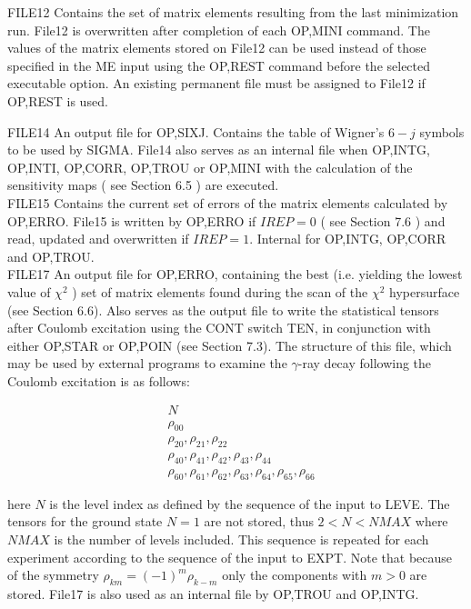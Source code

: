 \documentclass[10pt]{article}
\begin{document}
FILE12 Contains the set of matrix elements resulting from the last minimization run. File12 is overwritten after completion of each OP,MINI command. The values of the matrix elements stored on File12 can be used instead of those specified in the ME input using the OP,REST command before the selected executable option. An existing permanent file must be assigned to File12 if OP,REST is used.

FILE14 An output file for OP,SIXJ. Contains the table of Wigner's $6-j$ symbols to be used by SIGMA. File14 also serves as an internal file when OP,INTG, OP,INTI, OP,CORR, OP,TROU or OP,MINI with the calculation of the sensitivity maps ( see Section 6.5 ) are executed.\\
FILE15 Contains the current set of errors of the matrix elements calculated by OP,ERRO. File15 is written by OP,ERRO if $I R E P=0$ ( see Section 7.6 ) and read, updated and overwritten if $I R E P=1$. Internal for OP,INTG, OP,CORR and OP,TROU.\\
FILE17 An output file for OP,ERRO, containing the best (i.e. yielding the lowest value of $\chi^{2}$ ) set of matrix elements found during the scan of the $\chi^{2}$ hypersurface (see Section 6.6). Also serves as the output file to write the statistical tensors after Coulomb excitation using the CONT switch TEN, in conjunction with either OP,STAR or OP,POIN (see Section 7.3). The structure of this file, which may be used by external programs to examine the $\gamma$-ray decay following the Coulomb excitation is as follows:

$$
\begin{aligned}
& N \\
& \rho_{00} \\
& \rho_{20}, \rho_{21}, \rho_{22} \\
& \rho_{40}, \rho_{41}, \rho_{42}, \rho_{43}, \rho_{44} \\
& \rho_{60}, \rho_{61}, \rho_{62}, \rho_{63}, \rho_{64}, \rho_{65}, \rho_{66}
\end{aligned}
$$

here $N$ is the level index as defined by the sequence of the input to LEVE. The tensors for the ground state $N=1$ are not stored, thus $2<N<N M A X$ where $N M A X$ is the number of levels included. This sequence is repeated for each experiment according to the sequence of the input to EXPT. Note that because of the symmetry $\rho_{k m}=(-1)^{m} \rho_{k-m}$ only the components with $m>0$ are stored. File17 is also used as an internal file by OP,TROU and OP,INTG.
\end{document}
